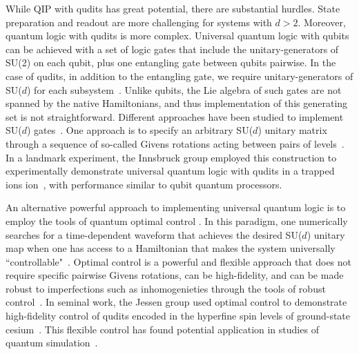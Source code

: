 \documentclass[aps,prl,twocolumn,reprint,superscriptaddress,footinbib]{revtex4-2}
\begin{document}
While QIP with qudits has great potential, there are substantial hurdles.  State preparation and readout are more challenging for systems with $d>2$.  Moreover, quantum logic with qudits is more complex.  Universal quantum logic with qubits can be achieved with a set of logic gates that include the unitary-generators of SU(2) on each qubit, plus one entangling gate between qubits pairwise.  In the case of qudits, in addition to the entangling gate, we require unitary-generators of SU($d$) for each subsystem~\cite{muthukrishnan2000multivalued,zhou2003quantum,brennen2005criteria,luo2014universal}. Unlike qubits, the Lie algebra of such gates are not spanned by the native Hamiltonians, and thus implementation of this generating set is not straightforward.  Different approaches have been studied to implement SU($d$) gates~\cite{Moreno2018,neeley2009emulation,Low2020,sawant2020,moro2019}. One approach is to specify an arbitrary SU($d$) unitary matrix through a sequence of so-called Givens rotations acting between pairs of levels~\cite{O'Leary2006}.   In a landmark experiment, the Innsbruck group employed this construction to experimentally demonstrate universal quantum logic with qudits in a trapped ions ion~\cite{ringbauer2021universal}, with performance similar to qubit quantum processors.

An alternative powerful approach to implementing universal quantum logic is to employ the tools of quantum optimal control . In this paradigm, one numerically searches for a time-dependent waveform that achieves the desired SU($d$) unitary map when one has access to a Hamiltonian that makes the system universally ``controllable"~\cite{Merkel2009,jurdjevic1972control,goerz2015optimizing, koch2016controlling,Frey2020,brockett1973lie,schirmer2002degrees}.  Optimal control is a powerful and flexible approach that does not require specific pairwise Givens rotations, can be high-fidelity, and can be made robust to imperfections such as inhomogenieties through the tools of robust control~\cite{anderson2015accurate, goerz2015optimizing, glaser2015training, koch2016controlling}. In seminal work, the Jessen group used optimal control to demonstrate high-fidelity control of qudits encoded in the hyperfine spin levels of ground-state cesium~\cite{Chaudhury2007, Smith2013}.  This flexible control has found potential application in studies of quantum simulation~\cite{Poggi2020}. 

\end{document}
